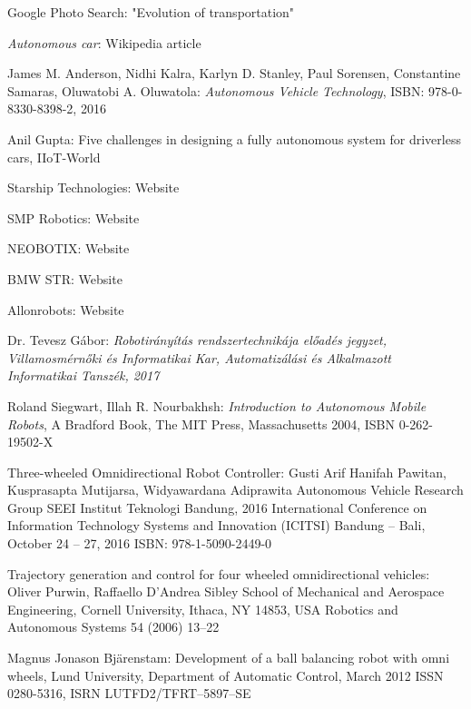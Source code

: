 \documentclass[12pt,english,twoside]{article}
\begin{document}
\newpage
\newpage
\begin{thebibliography}{1}
	
	
	 Google Photo Search: "Evolution of transportation"
	
	\emph{Autonomous car}: Wikipedia article
	
	James M. Anderson, Nidhi Kalra, Karlyn D. Stanley, Paul Sorensen, Constantine Samaras, Oluwatobi A. Oluwatola: \emph{Autonomous Vehicle Technology}, ISBN: 978-0-8330-8398-2, 2016
	
	Anil Gupta: Five challenges in designing a fully autonomous system for driverless cars, IIoT-World
	
	Starship Technologies: Website
	
	SMP Robotics: Website
	
	NEOBOTIX: Website
	
	BMW STR: Website
	
	 Allonrobots: Website
	
	Dr. Tevesz Gábor:
	\emph{Robotirányítás rendszertechnikája előadés jegyzet, Villamosmérnőki és Informatikai Kar, Automatizálási és Alkalmazott Informatikai Tanszék, 2017}
	
	Roland Siegwart, Illah R. Nourbakhsh:
	\emph{Introduction to Autonomous Mobile Robots}, A Bradford Book, The MIT Press, Massachusetts 2004,
	ISBN 0-262-19502-X
	
	 Three-wheeled Omnidirectional Robot Controller: Gusti Arif Hanifah Pawitan, Kusprasapta Mutijarsa, Widyawardana Adiprawita
	Autonomous Vehicle Research Group SEEI Institut Teknologi Bandung, 2016 International Conference on Information Technology Systems and Innovation (ICITSI)
	Bandung – Bali, October 24 – 27, 2016 ISBN: 978-1-5090-2449-0
	
	 Trajectory generation and control for four wheeled omnidirectional vehicles: Oliver Purwin, Raffaello D’Andrea
	Sibley School of Mechanical and Aerospace Engineering, Cornell University, Ithaca, NY 14853, USA
	Robotics and Autonomous Systems 54 (2006) 13–22
	
	 Magnus Jonason Bjärenstam: Development of a ball balancing robot
	with omni wheels, Lund University, Department of Automatic Control,	March 2012
	ISSN 0280-5316,	ISRN LUTFD2/TFRT--5897--SE
	

\end{thebibliography}
\end{document}
